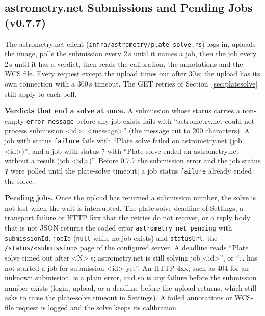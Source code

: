 \documentclass[11pt,a4paper]{article}
\newcommand{\code}[1]{\texttt{\small #1}}
\begin{document}
    \subsection{astrometry.net Submissions and Pending Jobs (v0.7.7)}
    \label{sec:nova}

    The astrometry.net client (\code{infra/\allowbreak astrometry/\allowbreak plate\_solve.rs}) logs in, uploads the image, polls the submission every 2\,s until it names a job, then the job every 2\,s until it has a verdict, then reads the calibration, the annotations and the WCS file. Every request except the upload times out after 30\,s; the upload has its own connection with a 300\,s timeout. The GET retries of Section~\ref{sec:platesolve} still apply to each poll.

    \textbf{Verdicts that end a solve at once.} A submission whose status carries a non-empty \code{error\_message} before any job exists fails with ``astrometry.net could not process submission \textless id\textgreater: \textless message\textgreater'' (the message cut to 200 characters). A job with status \code{failure} fails with ``Plate solve failed on astrometry.net (job \textless id\textgreater)'', and a job with status \code{?} with ``Plate solve ended on astrometry.net without a result (job \textless id\textgreater)''. Before 0.7.7 the submission error and the job status \code{?} were polled until the plate-solve timeout; a job status \code{failure} already ended the solve.

    \textbf{Pending jobs.} Once the upload has returned a submission number, the solve is not lost when the wait is interrupted. The plate-solve deadline of Settings, a transport failure or HTTP 5xx that the retries do not recover, or a reply body that is not JSON returns the coded error \code{astrometry\_net\_pending} with \code{submissionId}, \code{jobId} (\code{null} while no job exists) and \code{statusUrl}, the \code{/status/\textless submission\textgreater} page of the configured server. A deadline reads ``Plate solve timed out after \textless N\textgreater{} s; astrometry.net is still solving job \textless id\textgreater'', or ``\ldots{} has not started a job for submission \textless id\textgreater{} yet''. An HTTP 4xx, such as 404 for an unknown submission, is a plain error, and so is any failure before the submission number exists (login, upload, or a deadline before the upload returns, which still asks to raise the plate-solve timeout in Settings). A failed annotations or WCS-file request is logged and the solve keeps its calibration.
\end{document}
